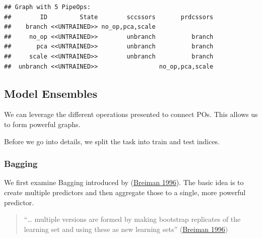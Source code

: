 \documentclass[
]{scrbook}
\newenvironment{Shaded}{\begin{snugshade}}{\end{snugshade}}
\newcommand{\DecValTok}[1]{\textcolor[rgb]{0.00,0.00,0.81}{#1}}
\newcommand{\FunctionTok}[1]{\textcolor[rgb]{0.00,0.00,0.00}{#1}}
\newcommand{\NormalTok}[1]{#1}
\newcommand{\OtherTok}[1]{\textcolor[rgb]{0.56,0.35,0.01}{#1}}
\newcommand{\SpecialCharTok}[1]{\textcolor[rgb]{0.00,0.00,0.00}{#1}}
\newcommand{\StringTok}[1]{\textcolor[rgb]{0.31,0.60,0.02}{#1}}
\renewenvironment{Shaded} {\begin{snugshade}\small} {\end{snugshade}}
\begin{document}
\begin{verbatim}
## Graph with 5 PipeOps:
##        ID         State        sccssors       prdcssors
##    branch <<UNTRAINED>> no_op,pca,scale                
##     no_op <<UNTRAINED>>        unbranch          branch
##       pca <<UNTRAINED>>        unbranch          branch
##     scale <<UNTRAINED>>        unbranch          branch
##  unbranch <<UNTRAINED>>                 no_op,pca,scale
\end{verbatim}

\hypertarget{pipe-model-ensembles}{%
\subsection{Model Ensembles}\label{pipe-model-ensembles}}

We can leverage the different operations presented to connect POs.
This allows us to form powerful graphs.

Before we go into details, we split the task into train and test indices.

\begin{Shaded}
\end{Shaded}

\hypertarget{pipe-model-ensembles-bagging}{%
\subsubsection{Bagging}\label{pipe-model-ensembles-bagging}}

We first examine Bagging introduced by (\protect\hyperlink{ref-Breiman1996}{Breiman 1996}).
The basic idea is to create multiple predictors and then aggregate those to a single, more powerful predictor.

\begin{quote}
``\ldots{} multiple versions are formed
by making bootstrap replicates of the learning set
and using these as new learning sets'' (\protect\hyperlink{ref-Breiman1996}{Breiman 1996})
\end{quote}
\end{document}
